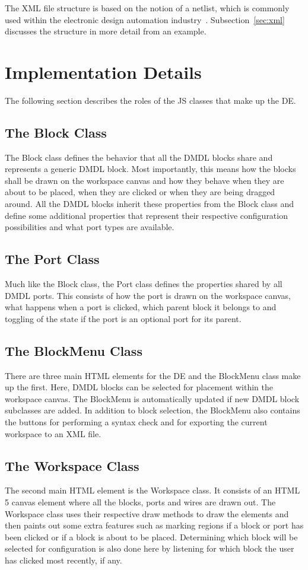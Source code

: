 \documentclass[journal,comsoc]{IEEEtran}
\begin{document}
The XML file structure is based on the notion of a netlist, which is commonly used within the
electronic design automation industry~\cite{netlist}. Subsection~\ref{sec:xml} discusses the
structure in more detail from an example.

\section{Implementation Details}
\label{sec:details}
The following section describes the roles of the JS classes that make up the DE.

\subsection{The Block Class}
The Block class defines the behavior that all the DMDL blocks share and represents a generic
DMDL block. Most importantly, this means how the blocks shall be drawn on the workspace canvas
and how they behave when they are about to be placed, when they are clicked or when they are being
dragged around. All the DMDL blocks inherit these properties from the Block class and define
some additional properties that represent their respective configuration possibilities and 
what port types are available.

\subsection{The Port Class}
Much like the Block class, the Port class defines the properties shared by all DMDL ports.
This consists of how the port is drawn on the workspace canvas, what happens when a port is
clicked, which parent block it belongs to and toggling of the state if the port is an optional
port for its parent.

\subsection{The BlockMenu Class}
There are three main HTML elements for the DE and the BlockMenu class make up the first.
Here, DMDL blocks can be selected for placement within the workspace canvas. The BlockMenu
is automatically updated if new DMDL block subclasses are added. In addition to block selection,
the BlockMenu also contains the buttons for performing a syntax check and for exporting the current
workspace to an XML file.

\subsection{The Workspace Class}
The second main HTML element is the Workspace class. It consists of an HTML 5 canvas element where
all the blocks, ports and wires are drawn out. The Workspace class uses their respective draw
methods to draw the elements and then paints out some extra features such as marking regions if
a block or port has been clicked or if a block is about to be placed. Determining which block will
be selected for configuration is also done here by listening for which block the user has clicked
most recently, if any.
\end{document}
